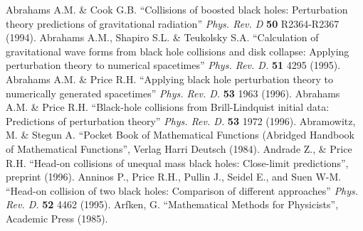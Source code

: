 \documentclass{article}
\begin{document}
\begin{thebibliography}{9}
    Abrahams A.M. \& Cook G.B. 
                        ``Collisions of boosted black holes: 
                          Perturbation theory predictions of 
                          gravitational radiation'' 
                        {\em Phys. Rev. D} 
                        {\bf 50} 
                        R2364-R2367 
                        (1994).
    Abrahams A.M., Shapiro S.L. \& Teukolsky S.A.  
                        ``Calculation of gravitational wave forms from 
                          black hole collisions and disk collapse: Applying
                          perturbation theory to numerical spacetimes''
                        {\em Phys. Rev. D.} 
                        {\bf 51}
                        4295
                        (1995).
   Abrahams A.M. \& Price R.H. 
                        ``Applying black hole perturbation
                          theory to numerically generated spacetimes'' 
                        {\em Phys. Rev. D.} 
                        {\bf 53} 
                        1963 
                        (1996).
   Abrahams A.M. \& Price R.H. 
                        ``Black-hole collisions from Brill-Lindquist 
                          initial data: Predictions of perturbation theory'' 
                        {\em Phys. Rev. D.} 
                        {\bf 53} 
                        1972 
                        (1996).
         Abramowitz, M. \& Stegun A. 
                        ``Pocket Book of Mathematical Functions 
                          (Abridged Handbook of Mathematical Functions'', 
                        Verlag Harri Deutsch 
                        (1984).
     Andrade Z., \& Price R.H. 
                        ``Head-on collisions of unequal mass black holes:
                          Close-limit predictions'', 
                        preprint 
                        (1996).
     Anninos P., Price R.H., Pullin J., Seidel E., 
                          and Suen W-M. 
                        ``Head-on collision of two black holes: 
                          Comparison of different approaches''
                        {\em Phys. Rev. D.} 
                        {\bf 52} 
                        4462 
                        (1995).
        Arfken, G. 
                        ``Mathematical Methods for Physicists'', 
                        Academic Press 
                        (1985).

\end{thebibliography}
\end{document}
